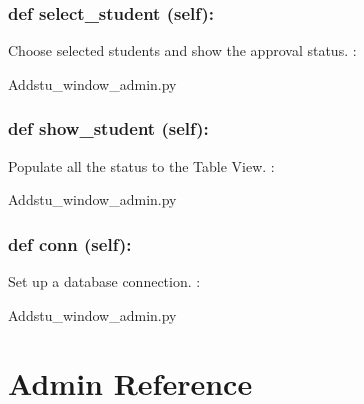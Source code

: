 \hypertarget{class_poly_a14a7ad77ce612b0c54f531d307ee4b39}{
\subsubsection[{def select_student(self):}]{\setlength{\rightskip}{0pt plus 5cm}def {select\_student} (self):}}\label{class_poly_a14a7ad77ce612b0c54f531d307ee4b39}
Choose selected students and show the approval status. 
:\begin{DoxyCompactItemize}
\item 
Addstu\_window\_admin.\-py\end{DoxyCompactItemize}

\hypertarget{class_poly_a14a7ad77ce612b0c54f531d307ee4b39}{
\subsubsection[{def show_student(self):}]{\setlength{\rightskip}{0pt plus 5cm}def {show\_student} (self):}}\label{class_poly_a14a7ad77ce612b0c54f531d307ee4b39}
Populate all the status to the Table View.
:\begin{DoxyCompactItemize}
\item 
Addstu\_window\_admin.\-py\end{DoxyCompactItemize}

\hypertarget{class_poly_a14a7ad77ce612b0c54f531d307ee4b39}{
\subsubsection[{def conn(self):}]{\setlength{\rightskip}{0pt plus 5cm}def {conn} (self):}}\label{class_poly_a14a7ad77ce612b0c54f531d307ee4b39}
Set up a database connection.
:\begin{DoxyCompactItemize}
\item 
Addstu\_window\_admin.\-py\end{DoxyCompactItemize}


\hypertarget{Admin}{\section{Admin Reference}
\label{Admin}
}
